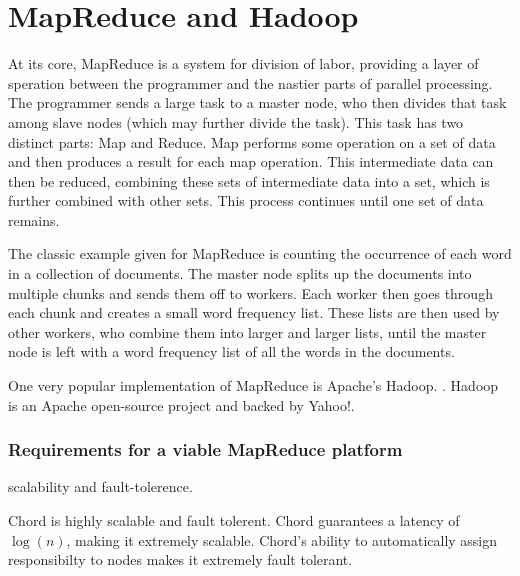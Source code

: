 \documentclass[conference, compsocconf, letterpaper]{IEEEtran}
\begin{document}



\section{MapReduce and Hadoop}
At its core, MapReduce \cite{mapreduce} is a system for division of labor, providing a layer of speration between the programmer and the nastier parts of parallel processing.  The programmer sends a large task to a master node, who then divides that task among slave nodes (which may further divide the task).  This task has two distinct parts: Map and Reduce.  Map performs some operation on a set of data and then produces a result for each map operation.  This intermediate data can then be reduced, combining these sets of intermediate data into a set, which is further combined with other sets.  This process continues until one set of data remains.

The classic example given for MapReduce is counting the occurrence of each word in a collection of documents.  The master node splits up the documents into multiple chunks and sends them off to workers.  Each worker then goes through each chunk and creates a small word frequency list.  These lists are then used by other workers, who combine them into larger and larger lists, until the master node is left with a word frequency list of all the words in the documents. 


One very popular implementation of MapReduce is Apache's Hadoop. \cite{Hadoop}.  Hadoop is an Apache open-source project and backed by Yahoo!. 


\subsubsection{Requirements for a viable MapReduce platform}
scalability and fault-tolerence.

Chord is highly scalable and fault tolerent.  Chord guarantees a latency of $\log(n)$, making it extremely scalable.  Chord's ability to automatically assign responsibilty to nodes makes it extremely fault tolerant.  
\end{document}
